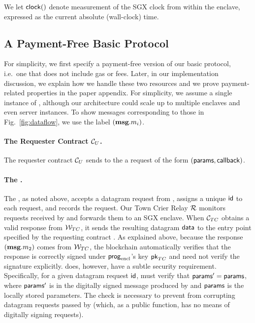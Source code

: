 We let ${{\sf clock}}()$ denote measurement of the SGX clock from within the enclave, expressed as the current absolute (wall-clock) time. 


\subsection{A Payment-Free Basic Protocol}
\label{sec:payment-free-protocol}

For simplicity, we first specify a payment-free version of our basic protocol, i.e.~one that does not include gas or fees. Later, in our implementation discussion, we explain how we handle these two resources and we prove payment-related properties in the paper appendix. For simplicity, we assume a single instance of \engine, although our architecture could scale up to multiple enclaves and even server instances. To show messages corresponding to those in Fig.~\ref{fig:dataflow}, we use the label $(\textbf{msg}.m_{i})$.

\paragraph{The Requester Contract ${\cal C}_U$.}
The requester contract ${\cal C}_U$ sends to the \tcontract \tcont
a request of the form $({\sf params}, {\sf callback})$.

\paragraph{The \tcontract \tcont.} 
The \tcontract, as noted above, accepts a datagram request from \reqcont, 
assigns a unique ${\sf id}$ to each request, and
records the request.
Our Town Crier Relay $\mathcal{R}$ monitors
requests received by \tcont and 
forwards them to an SGX enclave.
When ${\cal C}_{TC}$ obtains a valid response
from ${\cal W}_{TC}$,   
it 
sends the resulting datagram ${\sf data}$ to the entry point \dgcallback 
specified by the requesting contract \reqcont. As explained above, because the response $(\textbf{msg}.m_{2})$ comes from ${\cal W}_{TC}$, the blockchain automatically verifies that the response is correctly signed under ${\sf prog}_{\textrm{encl}}$'s key ${\sf pk}_{TC}$ and \tcont need not verify the signature explicitly. \tc does, however, have a subtle security requirement. Specifically,  for a given datagram request ${\sf id}$, \tcont must verify that ${\sf params}' = {\sf params}$, where ${\sf params}'$ is in the digitally signed message produced by \engine and ${\sf params}$ is the locally stored parameters. The check is necessary to prevent \relay from corrupting datagram requests passed by \tcont (which, as a public function, has no means of digitally signing requests). 

